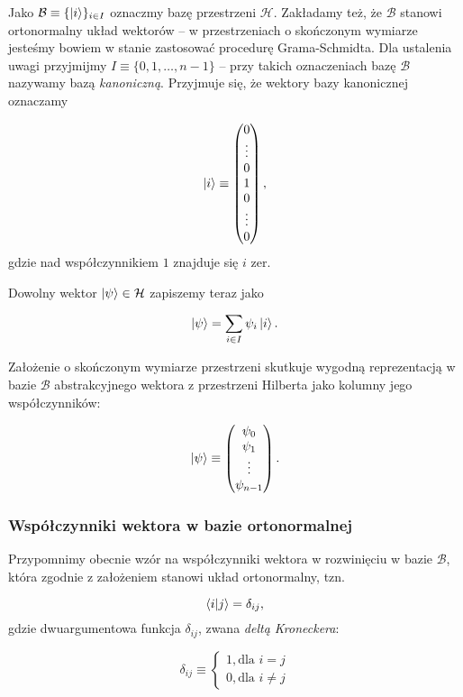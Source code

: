 Jako $\mathcal{B} \equiv \{\ket{i}\}_{i\in I}$ oznaczmy bazę przestrzeni $\mathcal{H}$. Zakładamy też, że $\mathcal{B}$ stanowi ortonormalny układ wektorów -- w przestrzeniach o skończonym wymiarze jesteśmy bowiem w stanie zastosować procedurę Grama-Schmidta. Dla ustalenia uwagi przyjmijmy $I \equiv \{0,1, \ldots , n - 1 \}$ -- przy takich oznaczeniach bazę $\mathcal{B}$ nazywamy bazą \textit{kanoniczną}. Przyjmuje się, że wektory bazy kanonicznej oznaczamy

$$
    \ket{i} \equiv
    \begin{pmatrix}
        0 \\
        \vdots \\
        0 \\
        1 \\
        0 \\
        \vdots \\
        0
    \end{pmatrix},
$$
gdzie nad współczynnikiem $1$ znajduje się $i$ zer.

Dowolny wektor $\ket{\psi} \in \mathcal{H}$ zapiszemy teraz jako

$$
    \ket{\psi} = \sum\limits_{i \in I} \psi_{i}\ket{i}.
$$

Założenie o skończonym wymiarze przestrzeni skutkuje wygodną reprezentacją w bazie $\mathcal{B}$ abstrakcyjnego wektora z przestrzeni Hilberta jako kolumny jego współczynników:

$$
    \ket{\psi} \equiv
    \begin{pmatrix}
        \psi_{0} \\
        \psi_{1} \\
        \vdots \\
        \psi_{n - 1} \\
    \end{pmatrix}.
$$

\subsubsection{Współczynniki wektora w bazie ortonormalnej}
\label{coefficients}

Przypomnimy obecnie wzór na współczynniki wektora w rozwinięciu w bazie $\mathcal{B}$, która zgodnie z założeniem stanowi układ ortonormalny, tzn. 

$$
    \bra{i}\ket{j} = \delta_{ij},
$$
gdzie dwuargumentowa funkcja $\delta_{ij}$, zwana \textit{deltą Kroneckera}:

$$
    \delta_{ij} \equiv
    \begin{cases}
        1, \text{dla } i = j \\
        0, \text{dla } i \neq j
    \end{cases}
$$

